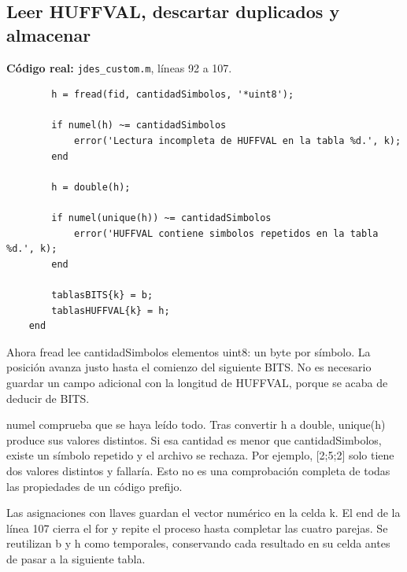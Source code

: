 \documentclass[11pt,a4paper,oneside]{report}
\begin{document}
\par\medskip\noindent\begin{minipage}{\linewidth}

\subsection{Leer HUFFVAL, descartar duplicados y almacenar}

\textbf{Código real:} \texttt{jdes\_custom.m}, líneas 92 a 107.

\begin{lstlisting}[firstnumber=92]
        % Cada simbolo de HUFFVAL ocupa un uint8.
        h = fread(fid, cantidadSimbolos, '*uint8');

        if numel(h) ~= cantidadSimbolos
            error('Lectura incompleta de HUFFVAL en la tabla %d.', k);
        end

        h = double(h);

        if numel(unique(h)) ~= cantidadSimbolos
            error('HUFFVAL contiene simbolos repetidos en la tabla %d.', k);
        end

        tablasBITS{k} = b;
        tablasHUFFVAL{k} = h;
    end
\end{lstlisting}

\end{minipage}\par


Ahora fread lee cantidadSimbolos elementos uint8: un byte por símbolo. La
posición avanza justo hasta el comienzo del siguiente BITS. No es necesario
guardar un campo adicional con la longitud de HUFFVAL, porque se acaba de
deducir de BITS.

numel comprueba que se haya leído todo. Tras convertir h a double, unique(h)
produce sus valores distintos. Si esa cantidad es menor que cantidadSimbolos,
existe un símbolo repetido y el archivo se rechaza. Por ejemplo, [2;5;2]
solo tiene dos valores distintos y fallaría. Esto no es una comprobación
completa de todas las propiedades de un código prefijo.

Las asignaciones con llaves guardan el vector numérico en la celda k.
El end de la línea 107 cierra el for y repite el proceso hasta completar
las cuatro parejas. Se reutilizan b y h como temporales, conservando cada
resultado en su celda antes de pasar a la siguiente tabla.
\end{document}
